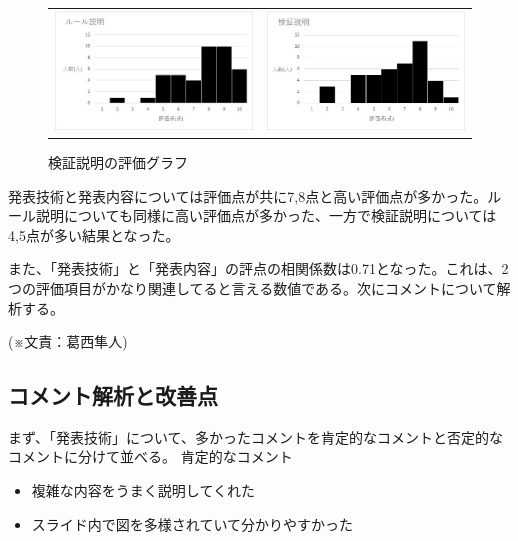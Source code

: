 \begin{figure}[h]
 \begin{tabular}{cc}
  \begin{minipage}[h]{0.45\hsize}
  \centering
 \includegraphics[width=0.7\linewidth]{./figure/ru-ru.jpg}
\caption{ルール説明の評価グラフ}
\label{ru-ru}
 \end{minipage} &

\begin{minipage}[h]{0.45\hsize}
  \centering
 \includegraphics[width=0.7\linewidth]{./figure/kensyou.jpg}
 \caption{検証説明の評価グラフ}
\label{kensyou}
\end{minipage} 
\end{tabular}
\end{figure}
発表技術と発表内容については評価点が共に7,8点と高い評価点が多かった。ルール説明についても同様に高い評価点が多かった、一方で検証説明については4,5点が多い結果となった。

また、「発表技術」と「発表内容」の評点の相関係数は0.71となった。これは、2つの評価項目がかなり関連してると言える数値である。次にコメントについて解析する。
\begin{flushright}
(※文責：葛西隼人)
\end{flushright}

\subsection{コメント解析と改善点}
まず、「発表技術」について、多かったコメントを肯定的なコメントと否定的なコメントに分けて並べる。
肯定的なコメント
\begin{itemize}
\item 複雑な内容をうまく説明してくれた
\item スライド内で図を多様されていて分かりやすかった
\end{itemize}

